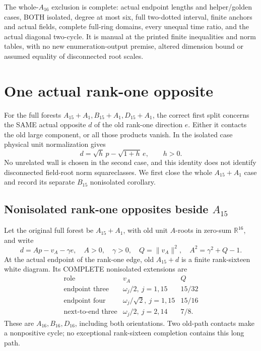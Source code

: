 \documentclass[11pt]{article}
\begin{document}
The whole-\(A_{16}\) exclusion is complete: actual endpoint
lengths and helper/golden cases, BOTH isolated, degree at most six,
full two-dotted interval, finite anchors and actual fields, complete
full-ring domains, every unequal time ratio, and the actual
diagonal two-cycle.
It is manual at the printed finite inequalities and norm tables,
with no new enumeration-output premise, altered dimension bound
or assumed equality of disconnected root scales.

\section{One actual rank-one opposite}
\label{app:arithrankone}

For the full forests \(A_{15}+A_1,B_{15}+A_1,D_{15}+A_1\),
the correct first split concerns the SAME actual opposite \(d\)
of the old rank-one direction \(e\).
Either it contacts the old large component, or all those products
vanish.  In the isolated case physical unit normalization gives
\[
                 d=\sqrt h\,p-\sqrt{1+h}\,e,\qquad h>0 .
\]
No unrelated wall is chosen in the second case, and this identity
does not identify disconnected field-root norm squareclasses.
We first close the whole \(A_{15}+A_1\) case and record its
separate \(B_{15}\) nonisolated corollary.

\subsection{Nonisolated rank-one opposites beside \(A_{15}\)}
\label{app:arithA15nonisolated}

Let the original full forest be \(A_{15}+A_1\), with old
unit \(A\)-roots in zero-sum \(\mathbb R^{16}\), and write
\[
 d=Ap-v_A-\gamma e,\quad A>0,\quad\gamma>0,\quad
 Q=\|v_A\|^2,\quad A^2=\gamma^2+Q-1.
\]
At the actual endpoint of the rank-one edge, old \(A_{15}+d\)
is a finite rank-sixteen white diagram.
Its COMPLETE nonisolated extensions are
\[
\begin{array}{c|c|c}
\text{role}&v_A&Q\\ \hline
\text{endpoint three}&\omega_j/2,\ j=1,15&15/32\\
\text{endpoint four}&\omega_j/\sqrt2,\ j=1,15&15/16\\
\text{next-to-end three}&\omega_j/2,\ j=2,14&7/8 .
\end{array}
\]
These are \(A_{16},B_{16},D_{16}\), including both orientations.
Two old-path contacts make a nonpositive cycle; no exceptional
rank-sixteen completion contains this long path.
\end{document}
